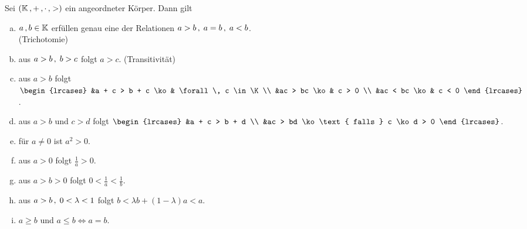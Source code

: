 \documentclass[../ana1.tex]{subfiles}
\begin{document}
\begin{satz}\label{satz:arechenregeln}
	Sei \((\mathbb{K} \operatorname{,} + \operatorname{,} \cdot \operatorname{,} >) \) ein angeordneter Körper. Dann gilt
	\begin{enumerate}[(a)]
		\item \(a \operatorname{,} b \in \mathbb{K} \) erfüllen genau eine der Relationen \(a > b \operatorname{,}  \; a = b \operatorname{,}  \; a < b \). \\
			  (Trichotomie)
		\item aus \(a > b \operatorname{,}  \; b > c \) folgt \(a > c \). (Transitivität)
		\item aus \(a > b \) folgt
		      \(\begin{lrcases}
					&a + c > b + c \ko & \forall \, c \in \K \\
				    &ac > bc \ko 	   & c > 0 \\
				    &ac < bc \ko 	   & c < 0
			    \end{lrcases} \).
		\item aus \(a > b \) und \(c>d \) folgt
		      \(\begin{lrcases}
				      &a + c > b + d  \\
					  &ac > bd \ko \text{ falls } c \ko d > 0
			      \end{lrcases} \).
		\item für \(a\neq 0 \) ist \(a^{2} > 0 \).
		\item aus \(a > 0 \) folgt \(\frac{1}{a} > 0 \).
		\item aus \(a > b > 0 \) folgt \(0 < \frac{1}{a} < \frac{1}{b} \).
		\item aus \(a > b \operatorname{,}  \; 0 < \lambda < 1 \) folgt \(b < \lambda b + (1 - \lambda)a < a \).
		\item \(a \geq b \) und \(a \leq b \iff a = b \).
	\end{enumerate}
\end{satz}
\end{document}
